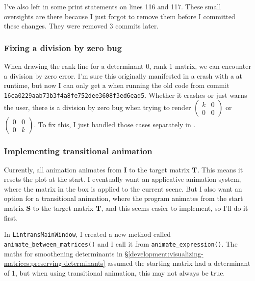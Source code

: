 \documentclass[../development.tex]{subfiles}
\begin{document}
I've also left in some print statements on lines 116 and 117. These small oversights are there because I just forgot to remove them before I committed these changes. They were removed 3 commits later.

\subsubsection{Fixing a division by zero bug\label{development:improving-the-gui:fixing-a-division-by-zero-bug}}

When drawing the rank line for a determinant 0, rank 1 matrix, we can encounter a division by zero error. I'm sure this originally manifested in a crash with a  at runtime, but now I can only get a  when running the old code from commit \texttt{16ca0229aab73b3f4a8fe752dee3608f3ed6ead5}. Whether it crashes or just warns the user, there is a division by zero bug when trying to render $\begin{pmatrix}k & 0\\ 0 & 0\end{pmatrix}$ or $\begin{pmatrix}0 & 0\\ 0 & k\end{pmatrix}$. To fix this, I just handled those cases separately in .


\subsubsection{Implementing transitional animation\label{development:improving-the-gui:implementing-transitional-animation}}

Currently, all animation animates from $\mathbf{I}$ to the target matrix $\mathbf{T}$. This means it resets the plot at the start. I eventually want an applicative animation system, where the matrix in the box is applied to the current scene. But I also want an option for a transitional animation, where the program animates from the start matrix $\mathbf{S}$ to the target matrix $\mathbf{T}$, and this seems easier to implement, so I'll do it first.

In \texttt{LintransMainWindow}, I created a new method called \texttt{animate\_between\_matrices()} and I call it from \texttt{animate\_expression()}. The maths for smoothening determinants in \S\ref{development:visualizing-matrices:preserving-determinants} assumed the starting matrix had a determinant of 1, but when using transitional animation, this may not always be true.
\end{document}
